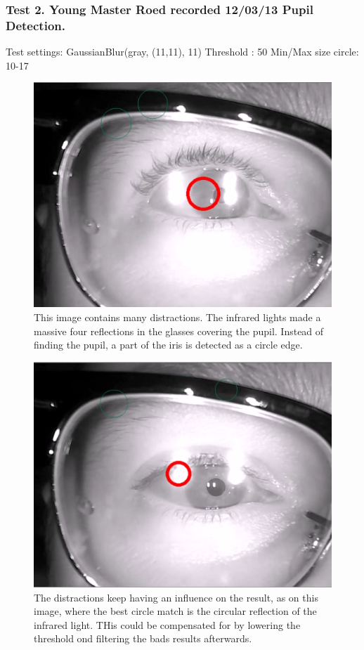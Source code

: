 \subsubsection{Test 2. Young Master Roed recorded 12/03/13 Pupil
Detection.}

Test settings: GaussianBlur(gray, (11,11), 11) Threshold : 50 Min/Max
size circle: 10-17

\begin{figure}[htbp]
\centering
\includegraphics{pics/hough/10.png}
\caption{This image contains many distractions. The infrared lights made
a massive four reflections in the glasses covering the pupil. Instead of
finding the pupil, a part of the iris is detected as a circle edge.
\label{hough10}}
\end{figure}

\begin{figure}[htbp]
\centering
\includegraphics{pics/hough/11.png}
\caption{The distractions keep having an influence on the result, as on
this image, where the best circle match is the circular reflection of
the infrared light. THis could be compensated for by lowering the
threshold ond filtering the bads results afterwards. \label{hough11}}
\end{figure}

